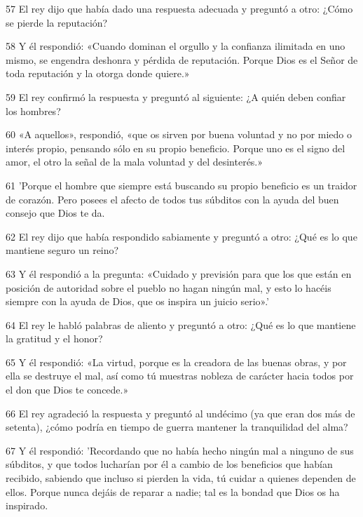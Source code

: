\par 57 El rey dijo que había dado una respuesta adecuada y preguntó a otro: ¿Cómo se pierde la reputación?

\par 58 Y él respondió: «Cuando dominan el orgullo y la confianza ilimitada en uno mismo, se engendra deshonra y pérdida de reputación. Porque Dios es el Señor de toda reputación y la otorga donde quiere.»

\par 59 El rey confirmó la respuesta y preguntó al siguiente: ¿A quién deben confiar los hombres?

\par 60 «A aquellos», respondió, «que os sirven por buena voluntad y no por miedo o interés propio, pensando sólo en su propio beneficio. Porque uno es el signo del amor, el otro la señal de la mala voluntad y del desinterés.»

\par 61 'Porque el hombre que siempre está buscando su propio beneficio es un traidor de corazón. Pero posees el afecto de todos tus súbditos con la ayuda del buen consejo que Dios te da.

\par 62 El rey dijo que había respondido sabiamente y preguntó a otro: ¿Qué es lo que mantiene seguro un reino?

\par 63 Y él respondió a la pregunta: «Cuidado y previsión para que los que están en posición de autoridad sobre el pueblo no hagan ningún mal, y esto lo hacéis siempre con la ayuda de Dios, que os inspira un juicio serio».'

\par 64 El rey le habló palabras de aliento y preguntó a otro: ¿Qué es lo que mantiene la gratitud y el honor?

\par 65 Y él respondió: «La virtud, porque es la creadora de las buenas obras, y por ella se destruye el mal, así como tú muestras nobleza de carácter hacia todos por el don que Dios te concede.»

\par 66 El rey agradeció la respuesta y preguntó al undécimo (ya que eran dos más de setenta), ¿cómo podría en tiempo de guerra mantener la tranquilidad del alma?

\par 67 Y él respondió: 'Recordando que no había hecho ningún mal a ninguno de sus súbditos, y que todos lucharían por él a cambio de los beneficios que habían recibido, sabiendo que incluso si pierden la vida, tú cuidar a quienes dependen de ellos. Porque nunca dejáis de reparar a nadie; tal es la bondad que Dios os ha inspirado.

